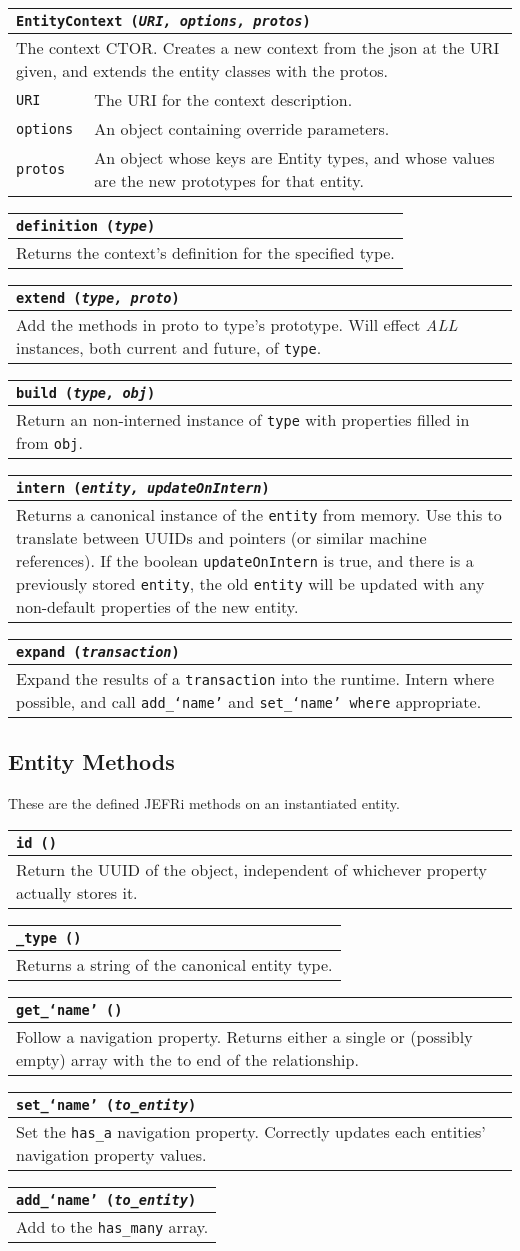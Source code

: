 \documentclass{article}
\newcommand{\ilcode}{\tt}
\newcommand{\method}[4]{
	\begin{tabular}{ | l | p{5in} | }
	\hline
	\multicolumn{2}{|l|}{\ilcode #1 ({\it #2})} \\
	\hline
	\multicolumn{2}{|p{6in}|}{#3} \\
	\hline
	#4
	\end{tabular}
}
\newcommand{\param}[2]{
	{\ilcode #1} & #2 \\
	\hline
}
\begin{document}
\method{EntityContext}{URI, options, protos}
{The context CTOR. Creates a new context from the json at the URI given,
	and extends the entity classes with the protos.}
{
	\param{URI}{The URI for the context description.}
	\param{options}{An object containing override parameters.}
	\param{protos}{An object whose keys are Entity types, and whose values
		are the new prototypes for that entity.}
}

\method{definition}{type}
{Returns the context's definition for the specified type.}
{}

\method{extend}{type, proto}
	{Add the methods in proto to type's prototype. Will effect {\it ALL}
	instances, both current and future, of {\ilcode type}.}{}

\method{build}{type, obj}
	{Return an non-interned instance of {\ilcode type} with properties
	filled in from {\ilcode obj}.}{}

\method{intern}{entity, updateOnIntern}
	{Returns a canonical instance of the {\ilcode entity} from memory. Use this to
	translate between UUIDs and pointers (or similar machine references). If
	the boolean {\ilcode updateOnIntern} is true, and there is a previously
	stored {\ilcode entity}, the old {\ilcode entity} will be updated with any non-default
	properties of the new entity.}{}

\method{expand}{transaction}
	{Expand the results of a {\ilcode transaction} into the runtime. Intern where
	possible, and call {\ilcode add\_`name'} and {\ilcode set\_`name' where}
	appropriate.}{}

\subsection{Entity Methods}
These are the defined JEFRi methods on an instantiated entity.

\method{id}{}
	{Return the UUID of the object, independent of whichever property
			actually stores it.}{}

\method{\_type}{}
	{Returns a string of the canonical entity type.}{}

\method{get\_`name'}{}
	{Follow a navigation property. Returns either a single or (possibly
			empty) array with the to end of the relationship.}{}

\method{set\_`name'}{to\_entity}
	{Set the {\ilcode has\_a} navigation property. Correctly updates
			each entities' navigation property values.}{}

\method{add\_`name'}{to\_entity}
	{Add to the {\ilcode has\_many} array.}{}
\end{document}
